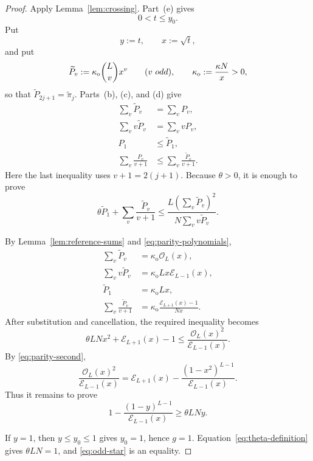 \documentclass[10pt,a4paper]{amsart}
\begin{document}
\begin{proof}
Apply Lemma~\ref{lem:crossing}.  Part~\textup{(e)} gives
\[
 0<t\le y_0.
\]
Put
\[
 y:=t,\qquad x:=\sqrt t,
\]
and put
\[
 \widetilde P_v:=\kappa_{\mathrm o}\binom Lv x^v
 \qquad(v\ {\rm odd}),
 \qquad
 \kappa_{\mathrm o}:=\frac{\kappa N}{x}>0,
\]
so that \(\widetilde P_{2j+1}=\widetilde\pi_j\).
Parts~\textup{(b)},
\textup{(c)}, and \textup{(d)} give
\begin{equation}\label{eq:odd-comparison-data}
\begin{aligned}
 \sum_v\widetilde P_v
 &=\sum_vP_v,\\
 \sum_vv\widetilde P_v
 &=\sum_vvP_v,\\
 P_1&\le\widetilde P_1,\\
 \sum_v\frac{P_v}{v+1}
 &\le
 \sum_v\frac{\widetilde P_v}{v+1}.
\end{aligned}
\end{equation}
Here the last inequality uses \(v+1=2(j+1)\).
Because \(\theta>0\), it is enough to prove
\[
 \theta\widetilde P_1
 +\sum_v\frac{\widetilde P_v}{v+1}
 \le
 \frac{L\left(\sum_v\widetilde P_v\right)^2}
 {N\sum_vv\widetilde P_v}.
\]

By Lemma~\ref{lem:reference-sums} and
\eqref{eq:parity-polynomials},
\[
\begin{aligned}
 \sum_v\widetilde P_v
 &=\kappa_{\mathrm o}\mathcal O_L(x),\\
 \sum_vv\widetilde P_v
 &=\kappa_{\mathrm o}Lx\mathcal E_{L-1}(x),\\
 \widetilde P_1
 &=\kappa_{\mathrm o}Lx,\\
 \sum_v\frac{\widetilde P_v}{v+1}
 &=\kappa_{\mathrm o}
 \frac{\mathcal E_{L+1}(x)-1}{Nx}.
\end{aligned}
\]
After substitution and cancellation, the required inequality becomes
\[
 \theta LNx^2+\mathcal E_{L+1}(x)-1
 \le
 \frac{\mathcal O_L(x)^2}{\mathcal E_{L-1}(x)}.
\]
By \eqref{eq:parity-second},
\[
 \frac{\mathcal O_L(x)^2}{\mathcal E_{L-1}(x)}
 =
 \mathcal E_{L+1}(x)
 -
 \frac{(1-x^2)^{L-1}}{\mathcal E_{L-1}(x)}.
\]
Thus it remains to prove
\begin{equation}\label{eq:odd-star}
 1-\frac{(1-y)^{L-1}}{\mathcal E_{L-1}(x)}
 \ge\theta LNy.
\end{equation}

If \(y=1\), then \(y\le y_0\le1\) gives \(y_0=1\), hence \(g=1\).
Equation~\eqref{eq:theta-definition} gives \(\theta LN=1\), and
\eqref{eq:odd-star} is an equality.


\end{proof}
\end{document}
